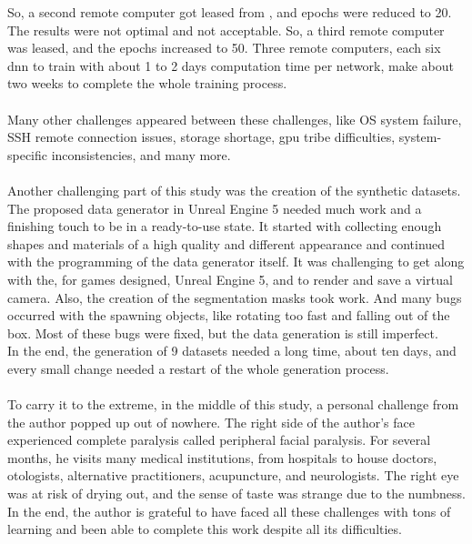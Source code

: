 		So, a second remote computer got leased from \cite{shadow}, and epochs were reduced to 20. The results were not optimal and not acceptable. So, a third remote computer was leased, and the epochs increased to 50. Three remote computers, each six \ac{dnn} to train with about 1 to 2 days computation time per network, make about two weeks to complete the whole training process. \\
		\\
		Many other challenges appeared between these challenges, like OS system failure, SSH remote connection issues, storage shortage, \ac{gpu} tribe difficulties,  system-specific inconsistencies, and many more.\\
		\\
		Another challenging part of this study was the creation of the synthetic datasets. The proposed data generator in Unreal Engine 5 needed much work and a finishing touch to be in a ready-to-use state. It started with collecting enough shapes and materials of a high quality and different appearance and continued with the programming of the data generator itself. It was challenging to get along with the, for games designed, Unreal Engine 5, and to render and save a virtual camera. Also, the creation of the segmentation masks took work. And many bugs occurred with the spawning objects, like rotating too fast and falling out of the box. Most of these bugs were fixed, but the data generation is still imperfect.\\
		In the end, the generation of 9 datasets needed a long time, about ten days, and every small change needed a restart of the whole generation process.\\
		\\
		To carry it to the extreme, in the middle of this study, a personal challenge from the author popped up out of nowhere. The right side of the author's face experienced complete paralysis called peripheral facial paralysis. For several months, he visits many medical institutions, from hospitals to house doctors, otologists, alternative practitioners, acupuncture, and neurologists. The right eye was at risk of drying out, and the sense of taste was strange due to the numbness. \\
		In the end, the author is grateful to have faced all these challenges with tons of learning and been able to complete this work despite all its difficulties.
		






